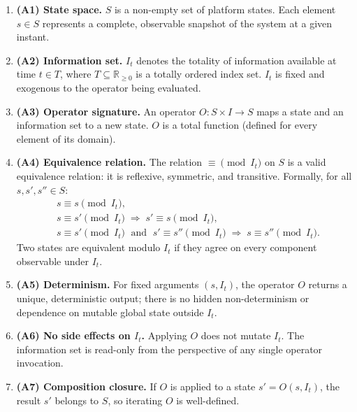 \documentclass[12pt,openany]{book}
\newcommand{\calI}{\mathcal{I}}
\numberwithin{equation}{chapter}
\theoremstyle{plain}
\theoremstyle{definition}
\theoremstyle{remark}
\numberwithin{equation}{chapter}
\theoremstyle{plain}
\newcommand{\calS}{\mathcal{S}}
\newcommand{\calT}{\mathcal{T}}
\def\calI{I}%
\def\calS{S}%
\def\calT{T}%
\begin{document}
\begin{enumerate}
  \item \textbf{(A1) State space.}
        $\calS$ is a non-empty set of platform states.  Each element
        $s \in \calS$ represents a complete, observable snapshot of
        the system at a given instant.

  \item \textbf{(A2) Information set.}
        $\calI_t$ denotes the totality of information available at
        time $t \in \calT$, where $\calT \subseteq \mathbb{R}_{\geq 0}$
        is a totally ordered index set.  $\calI_t$ is fixed and
        exogenous to the operator being evaluated.

  \item \textbf{(A3) Operator signature.}
        An operator $O : \calS \times \calI \to \calS$ maps a state
        and an information set to a new state.  $O$ is a total function
        (defined for every element of its domain).

  \item \textbf{(A4) Equivalence relation.}
        The relation $\equiv \pmod{\calI_t}$ on $\calS$ is a valid
        equivalence relation: it is reflexive, symmetric, and
        transitive.  Formally, for all $s, s', s'' \in \calS$:
        \begin{align}
          &s \equiv s \pmod{\calI_t},
            \label{eq:equiv-refl} \\
          &s \equiv s' \pmod{\calI_t}
            \;\Longrightarrow\;
            s' \equiv s \pmod{\calI_t},
            \label{eq:equiv-sym} \\
          &s \equiv s' \pmod{\calI_t}
            \;\text{ and }\;
            s' \equiv s'' \pmod{\calI_t}
            \;\Longrightarrow\;
            s \equiv s'' \pmod{\calI_t}.
            \label{eq:equiv-trans}
        \end{align}
        Two states are equivalent modulo $\calI_t$ if they agree on
        every component observable under $\calI_t$.

  \item \textbf{(A5) Determinism.}
        For fixed arguments $(s, \calI_t)$, the operator $O$ returns a
        unique, deterministic output; there is no hidden non-determinism
        or dependence on mutable global state outside $\calI_t$.

  \item \textbf{(A6) No side effects on $\calI_t$.}
        Applying $O$ does not mutate $\calI_t$.  The information set is
        read-only from the perspective of any single operator
        invocation.

  \item \textbf{(A7) Composition closure.}
        If $O$ is applied to a state $s' = O(s, \calI_t)$, the result
        $s'$ belongs to $\calS$, so iterating $O$ is well-defined.
\end{enumerate}
\end{document}
